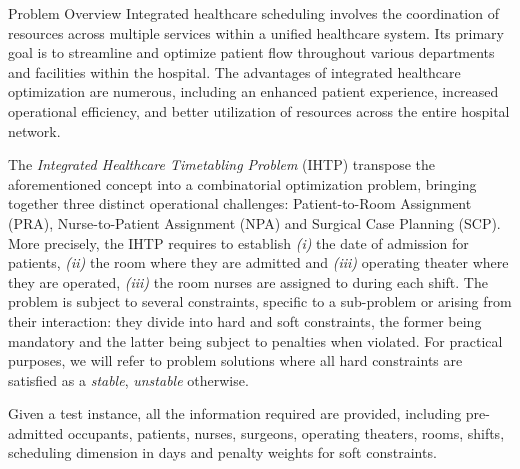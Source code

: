 \begin{section}{Problem Overview}
 Integrated healthcare scheduling involves the coordination of resources
 across multiple services within a unified healthcare system. Its primary
 goal is to streamline and optimize patient flow throughout various departments
 and facilities within the hospital. The advantages of integrated healthcare
 optimization are numerous, including an enhanced patient experience, increased
 operational efficiency, and better utilization of resources across the entire
 hospital network.

 The \textit{Integrated Healthcare Timetabling Problem} (IHTP) \cite{ihtc2024} transpose the
 aforementioned concept into a combinatorial optimization problem, bringing together
 three distinct operational challenges:
 Patient-to-Room Assignment (PRA), Nurse-to-Patient Assignment (NPA) and
 Surgical Case Planning (SCP).
 More precisely, the IHTP requires to establish \textit{(i)} the date of admission for patients,
 \textit{(ii)} the room where they are admitted and \textit{(iii)} operating theater where they are operated,
 \textit{(iii)} the room nurses are assigned to during each shift.
 The problem is subject to several constraints, specific to a sub-problem or arising from their interaction: they divide
 into hard and soft constraints, the former being mandatory and
 the latter being subject to penalties when violated. For practical purposes, we will refer to problem solutions
 where all hard constraints are satisfied as a \textit{stable}, \textit{unstable} otherwise.

 Given a test instance, all the information required are provided,
 including pre-admitted occupants, patients, nurses, surgeons,
 operating theaters, rooms, shifts, scheduling dimension in days and penalty weights for soft constraints.


\end{section}